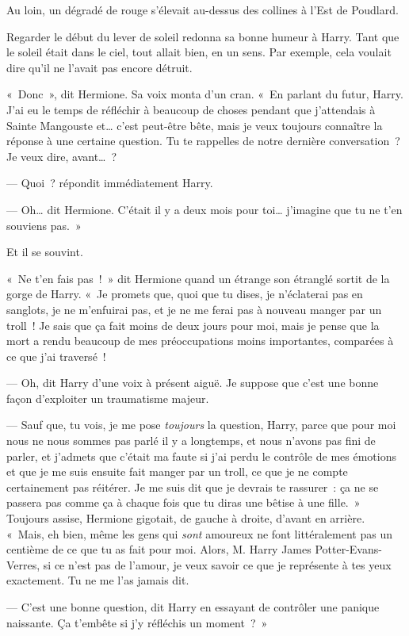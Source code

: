 Au loin, un dégradé de rouge s'élevait au-dessus des collines à l'Est de Poudlard.

Regarder le début du lever de soleil redonna sa bonne humeur à Harry. Tant que le soleil était dans le ciel, tout allait bien, en un sens. Par exemple, cela voulait dire qu'il ne l'avait pas encore détruit.

«~Donc~», dit Hermione. Sa voix monta d'un cran. «~En parlant du futur, Harry. J'ai eu le temps de réfléchir à beaucoup de choses pendant que j'attendais à Sainte Mangouste et… c'est peut-être bête, mais je veux toujours connaître la réponse à une certaine question. Tu te rappelles de notre dernière conversation~? Je veux dire, avant…~?

--- Quoi~? répondit immédiatement Harry.

--- Oh… dit Hermione. C'était il y a deux mois pour toi… j'imagine que tu ne t'en souviens pas.~»

Et il se souvint.

«~Ne t'en fais pas~!~» dit Hermione quand un étrange son étranglé sortit de la gorge de Harry. «~Je promets que, quoi que tu dises, je n'éclaterai pas en sanglots, je ne m'enfuirai pas, et je ne me ferai pas à nouveau manger par un troll~! Je sais que ça fait moins de deux jours pour moi, mais je pense que la mort a rendu beaucoup de mes préoccupations moins importantes, comparées à ce que j'ai traversé~!

--- Oh, dit Harry d'une voix à présent aiguë. Je suppose que c'est une bonne façon d'exploiter un traumatisme majeur.

--- Sauf que, tu vois, je me pose \emph{toujours} la question, Harry, parce que pour moi nous ne nous sommes pas parlé il y a longtemps, et nous n'avons pas fini de parler, et j'admets que c'était ma faute si j'ai perdu le contrôle de mes émotions et que je me suis ensuite fait manger par un troll, ce que je ne compte certainement pas réitérer. Je me suis dit que je devrais te rassurer~: ça ne se passera pas comme ça à chaque fois que tu diras une bêtise à une fille.~» Toujours assise, Hermione gigotait, de gauche à droite, d'avant en arrière. «~Mais, eh bien, même les gens qui \emph{sont} amoureux ne font littéralement pas un centième de ce que tu as fait pour moi. Alors, M. Harry James Potter-Evans-Verres, si ce n'est pas de l'amour, je veux savoir ce que je représente à tes yeux exactement. Tu ne me l'as jamais dit.

--- C'est une bonne question, dit Harry en essayant de contrôler une panique naissante. Ça t'embête si j'y réfléchis un moment~?~»


